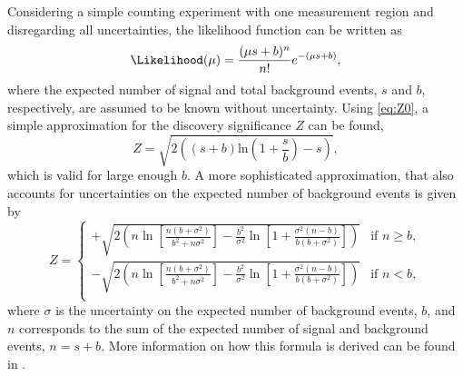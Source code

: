 Considering a simple counting experiment with one measurement region and disregarding all uncertainties, the likelihood function can be written as
\begin{equation}
  \Likelihood(\mu) = \frac{(\mu s +b)^n}{n!} e^{-(\mu s+b)},
\end{equation}
where the expected number of signal and total background events, $s$ and $b$, respectively, are assumed to be known without uncertainty.
Using \cref{eq:Z0}, a simple approximation for the discovery significance $Z$ can be found,
\begin{equation}
  Z = \sqrt{2 \left( \left(s + b\right) \text{ln}\left(1 + \frac{s}{b}\right) - s\right)},
\end{equation}
which is valid for large enough $b$.
A more sophisticated approximation, that also accounts for uncertainties on the expected number of background events is given by
\begin{equation}
    Z = 
    \begin{cases}
    + \sqrt{ 2 \left( n \ln \left[ \frac{n \left( b + \sigma^2 \right)}{b^2 + n \sigma^2} \right] - \frac{b^2}{\sigma^2} \ln \left[ 1 + \frac{\sigma^2 \left(n - b \right) }{b \left( b + \sigma ^2 \right) } \right] \right)   } & \text{if } n \geq b, \\
    - \sqrt{ 2 \left( n \ln \left[ \frac{n \left( b + \sigma^2 \right)}{b^2 + n \sigma^2} \right] - \frac{b^2}{\sigma^2} \ln \left[ 1 + \frac{\sigma^2 \left(n - b \right) }{b \left( b + \sigma ^2 \right) } \right] \right)   } & \text{if } n < b, \\
\end{cases}
\end{equation}
where $\sigma$ is the uncertainty on the expected number of background events, $b$, and $n$ corresponds to the sum of the expected number of signal and background events, $n = s+b$.
More information on how this formula is derived can be found in .


